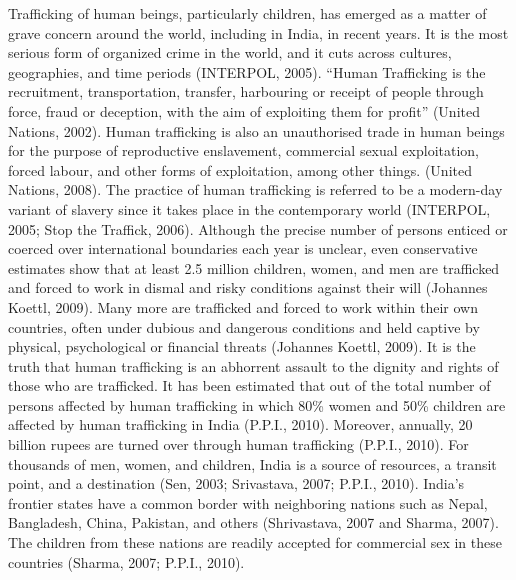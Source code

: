 \setcounter{figure}{0}
\setcounter{table}{0}
\setcounter{footnote}{0}

\label{2016-art5}

\vspace{-.3cm}




\begin{multicols}{2}


\noi
Trafficking of human beings, particularly children, has emerged as a matter of grave concern around the world, including in India, in recent years. It is the most serious form of organized crime in the world, and it cuts across cultures, geographies, and time periods (INTERPOL, 2005). “Human Trafficking is the recruitment, transportation, transfer, harbouring or receipt of people through force, fraud or deception, with the aim of exploiting them for profit” (United Nations, 2002). Human trafficking is also an unauthorised trade in human beings for the purpose of reproductive enslavement, commercial sexual exploitation, forced labour, and other forms of exploitation, among other things. (United Nations, 2008). The practice of human trafficking is referred to be a modern-day variant of slavery since it takes place in the contemporary world (INTERPOL, 2005; Stop the Traffick, 2006). Although the precise number of persons enticed or coerced over international boundaries each year is unclear, even conservative estimates show that at least 2.5 million children, women, and men are trafficked and forced to work in dismal and risky conditions against their will (Johannes Koettl, 2009). Many more are trafficked and forced to work within their own countries, often under dubious and dangerous conditions and held captive by physical, psychological or financial threats (Johannes Koettl, 2009). It is the truth that human trafficking is an abhorrent assault to the dignity and rights of those who are trafficked. It has been estimated that out of the total number of persons affected by human trafficking in which 80\% women and 50\% children are affected by human trafficking in India (P.P.I., 2010). Moreover, annually, 20 billion rupees are turned over through human trafficking (P.P.I., 2010). For thousands of men, women, and children, India is a source of resources, a transit point, and a destination (Sen, 2003; Srivastava, 2007; P.P.I., 2010). India's frontier states have a common border with neighboring nations such as Nepal, Bangladesh, China, Pakistan, and others (Shrivastava, 2007 and Sharma, 2007). The children from these nations are readily accepted for commercial sex in these countries (Sharma, 2007; P.P.I., 2010).


\end{multicols}
